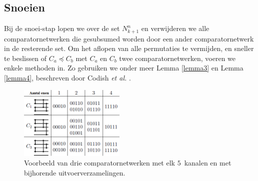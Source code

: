 \documentclass{article}
\begin{document}
\subsection{Snoeien}\label{Snoeien}
Bij de snoei-stap lopen we over de set $N^n_{k+1}$ en verwijderen we alle comparatornetwerken die gesubsumed worden door een ander comparatornetwerk in de resterende set.
Om het aflopen van alle permutaties te vermijden, en sneller te beslissen of $C_a \preceq C_b$ met $C_a$ en $C_b$ twee comparatornetwerken, voeren we enkele methoden in.
Zo gebruiken we onder meer Lemma \ref{lemma3} en Lemma \ref{lemma4}, beschreven door Codish \textit{et al.} \cite{sortingNetworksSize2014}.

\begin{figure}[!h]
	\centering
	\includegraphics[width=0.45\textwidth]{VoorbeeldLemmas.png}
	\caption{Voorbeeld van drie comparatornetwerken met elk $5$~kanalen en met bijhorende uitvoerverzamelingen.\protect\cite{sortingNetworksSize2014}}
	\label{VoorbeeldLemmas}
\end{figure}
\end{document}
